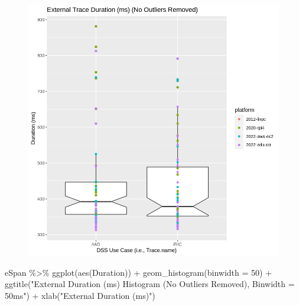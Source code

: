 \documentclass[
  letterpaper,
  DIV=11,
  numbers=noendperiod]{scrartcl}
\newenvironment{Shaded}{\begin{snugshade}}{\end{snugshade}}
\newcommand{\AttributeTok}[1]{\textcolor[rgb]{0.40,0.45,0.13}{#1}}
\newcommand{\DecValTok}[1]{\textcolor[rgb]{0.68,0.00,0.00}{#1}}
\newcommand{\FunctionTok}[1]{\textcolor[rgb]{0.28,0.35,0.67}{#1}}
\newcommand{\NormalTok}[1]{\textcolor[rgb]{0.00,0.23,0.31}{#1}}
\newcommand{\SpecialCharTok}[1]{\textcolor[rgb]{0.37,0.37,0.37}{#1}}
\newcommand{\StringTok}[1]{\textcolor[rgb]{0.13,0.47,0.30}{#1}}
\begin{document}
\begin{figure}[H]

{\centering \includegraphics{dss-span-analysis-rev5_files/figure-pdf/cell-61-output-1.png}

}

\end{figure}

\begin{Shaded}
\begin{Highlighting}[]
\NormalTok{eSpan }\SpecialCharTok{\%\textgreater{}\%}
    \FunctionTok{ggplot}\NormalTok{(}\FunctionTok{aes}\NormalTok{(Duration)) }\SpecialCharTok{+} \FunctionTok{geom\_histogram}\NormalTok{(}\AttributeTok{binwidth =} \DecValTok{50}\NormalTok{) }\SpecialCharTok{+}
    \FunctionTok{ggtitle}\NormalTok{(}\StringTok{"External Duration (ms) Histogram (No Outliers Removed), Binwidth = 50ms"}\NormalTok{) }\SpecialCharTok{+}
    \FunctionTok{xlab}\NormalTok{(}\StringTok{"External Duration (ms)"}\NormalTok{)}
\end{Highlighting}
\end{Shaded}
\end{document}
